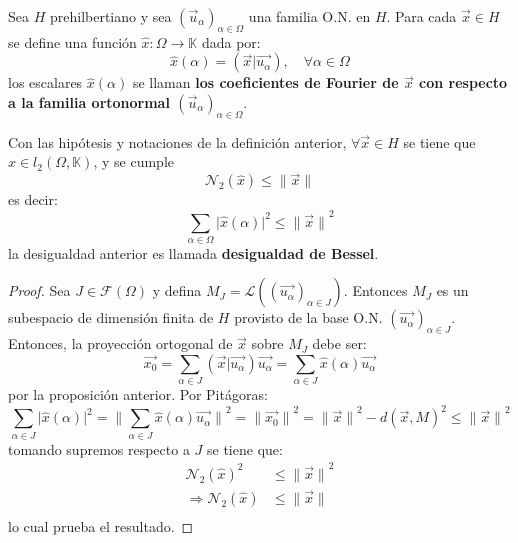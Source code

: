 \documentclass[12pt]{report}
\theoremstyle{largebreak}
\newcommand\cf[3]{\ensuremath{#1:#2\rightarrow#3}}
\newcommand\abs[1]{\ensuremath{\big|#1\big|}}
\newcommand\norm[1]{\ensuremath{\|#1\|}}
\newcommand\pint[2]{\ensuremath{\left(#1\big| #2\right)}}
\begin{document}
    \begin{mydef}
        Sea $H$ prehilbertiano y sea $(\vec{u}_\alpha)_{\alpha\in\Omega}$ una familia O.N. en $H$. Para cada $\vec{x}\in H$ se define una función $\cf{\hat{x}}{\Omega}{\mathbb{K}}$ dada por:
        \begin{equation*}
            \hat{x}(\alpha)=\pint{\vec{x}}{\vec{u_\alpha}},\quad\forall\alpha\in\Omega
        \end{equation*}
        los escalares $\hat{x}(\alpha)$ se llaman \textbf{los coeficientes de Fourier de $\vec{x}$ con respecto a la familia ortonormal $(\vec{u}_\alpha)_{\alpha\in\Omega}$}.
    \end{mydef}

    \begin{theor}
        Con las hipótesis y notaciones de la definición anterior, $\forall\vec{x}\in H$ se tiene que $\hat{x}\in l_2(\Omega,\mathbb{K})$, y se cumple
        \begin{equation*}
            \mathcal{N}_2(\hat{x})\leq\norm{\vec{x}}
        \end{equation*}
        es decir:
        \begin{equation*}
            \sum_{\alpha\in\Omega}\abs{\hat{x}(\alpha)}^2\leq\norm{\vec{x}}^2
        \end{equation*}
        la desigualdad anterior es llamada \textbf{desigualdad de Bessel}.
    \end{theor}

    \begin{proof}
        Sea $J\in\mathcal{F}(\Omega)$ y defina $M_J=\mathcal{L}((\vec{u_\alpha})_{\alpha\in J})$. Entonces $M_J$ es un subespacio de dimensión finita de $H$ provisto de la base O.N. $(\vec{u_\alpha})_{\alpha\in J}$. Entonces, la proyección ortogonal de $\vec{x}$ sobre $M_J$ debe ser:
        \begin{equation*}
            \vec{x_0}=\sum_{\alpha\in J }\pint{\vec{x}}{\vec{u_\alpha}}\vec{u_\alpha}=\sum_{\alpha\in J }\hat{x}(\alpha)\vec{u_\alpha}
        \end{equation*}
        por la proposición anterior. Por Pitágoras:
        \begin{equation*}
            \sum_{\alpha\in J}\abs{\hat{x}(\alpha)}^2=\norm{\sum_{\alpha\in J}\hat{x}(\alpha)\vec{u_\alpha}}^2=\norm{\vec{x_0}}^2=\norm{\vec{x}}^2-d(\vec{x},M)^2\leq\norm{\vec{x}}^2
        \end{equation*}
        tomando supremos respecto a $J$ se tiene que:
        \begin{equation*}
            \begin{split}
                \mathcal{N}_2(\hat{x})^2&\leq\norm{\vec{x}}^2\\
                \Rightarrow \mathcal{N}_2(\hat{x})&\leq\norm{\vec{x}}\\
            \end{split}
        \end{equation*}
        lo cual prueba el resultado.
    \end{proof}
\end{document}
